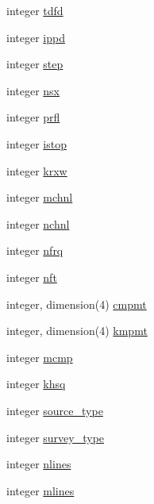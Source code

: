 \begin{DoxyCompactItemize}
integer \hyperlink{namespacelg__input__routines_a2eaf0660c29a584e802dcdf7aeaf8fed}{tdfd}
\item 
integer \hyperlink{namespacelg__input__routines_a4eb4ee97a7b4d0a162e4c92b3c592678}{ippd}
\item 
integer \hyperlink{namespacelg__input__routines_ab6c33e83097a9da89df8e7619e39db79}{step}
\item 
integer \hyperlink{namespacelg__input__routines_a824421dcc2d27ef1019d96edca43973b}{nsx}
\item 
integer \hyperlink{namespacelg__input__routines_a22e8c0e456440e4c42347d12a3bca9fb}{prfl}
\item 
integer \hyperlink{namespacelg__input__routines_a23b2611e5e3842861e03d1b579dc49aa}{istop}
\item 
integer \hyperlink{namespacelg__input__routines_a6e9f307b4197279d1b7e3343d2ef2ae0}{krxw}
\item 
integer \hyperlink{namespacelg__input__routines_afe38ea783532fc3907b8e2a14dca9f56}{mchnl}
\item 
integer \hyperlink{namespacelg__input__routines_ab0df43bcb1062d866441722ec2cb60be}{nchnl}
\item 
integer \hyperlink{namespacelg__input__routines_a81f61700f8b72e38a0a2956ff7e34383}{nfrq}
\item 
integer \hyperlink{namespacelg__input__routines_a7699250d511dad1cbb727dafc82df908}{nft}
\item 
integer, dimension(4) \hyperlink{namespacelg__input__routines_aa1e90821ade680361e1ae7f091fe973b}{cmpmt}
\item 
integer, dimension(4) \hyperlink{namespacelg__input__routines_a85f616adbe6187683a55c9ad1d0515dd}{kmpmt}
\item 
integer \hyperlink{namespacelg__input__routines_a102c576e29efd44cb401abd2a7b19f94}{mcmp}
\item 
integer \hyperlink{namespacelg__input__routines_a1dd929af54eac2b06f42ee3e4641bea1}{khsq}
\item 
integer \hyperlink{namespacelg__input__routines_a5e67c1ccd96e60a3baac0f052f42b694}{source\+\_\+type}
\item 
integer \hyperlink{namespacelg__input__routines_a768c5e94c3ddc2f0fc0bdd032c794cc6}{survey\+\_\+type}
\item 
integer \hyperlink{namespacelg__input__routines_ae13aeece4a34e71311078fd0d3f07861}{nlines}
\item 
integer \hyperlink{namespacelg__input__routines_ab9031c82464776c476a344366cd1453e}{mlines}
\item 

\end{DoxyCompactItemize}
